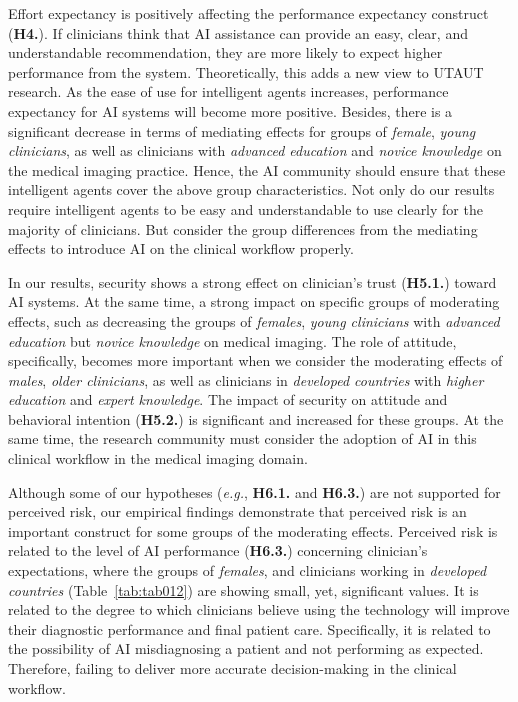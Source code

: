 Effort expectancy is positively affecting the performance expectancy construct ({\bf H4.}).
If clinicians think that AI assistance can provide an easy, clear, and understandable recommendation, they are more likely to expect higher performance from the system.
Theoretically, this adds a new view to UTAUT research.
As the ease of use for intelligent agents increases, performance expectancy for AI systems will become more positive.
Besides, there is a significant decrease in terms of mediating effects for groups of {\it female}, {\it young clinicians}, as well as clinicians with {\it advanced education} and {\it novice knowledge} on the medical imaging practice.
Hence, the AI community should ensure that these intelligent agents cover the above group characteristics.
Not only do our results require intelligent agents to be easy and understandable to use clearly for the majority of clinicians.
But consider the group differences from the mediating effects to introduce AI on the clinical workflow properly.

In our results, security shows a strong effect on clinician's trust ({\bf H5.1.}) toward AI systems. At the same time, a strong impact on specific groups of moderating effects, such as decreasing the groups of {\it females}, {\it young clinicians} with {\it advanced education} but {\it novice knowledge} on medical imaging.
The role of attitude, specifically, becomes more important when we consider the moderating effects of {\it males}, {\it older clinicians}, as well as clinicians in {\it developed countries} with {\it higher education} and {\it expert knowledge}.
The impact of security on attitude and behavioral intention ({\bf H5.2.}) is significant and increased for these groups. At the same time, the research community must consider the adoption of AI in this clinical workflow in the medical imaging domain.

Although some of our hypotheses ({\it e.g.}, {\bf H6.1.} and {\bf H6.3.}) are not supported for perceived risk, our empirical findings demonstrate that perceived risk is an important construct for some groups of the moderating effects.
Perceived risk is related to the level of AI performance ({\bf H6.3.}) concerning clinician's expectations, where the groups of {\it females}, and clinicians working in {\it developed countries} (Table~\ref{tab:tab012}) are showing small, yet, significant values.
It is related to the degree to which clinicians believe using the technology will improve their diagnostic performance and final patient care.
Specifically, it is related to the possibility of AI misdiagnosing a patient and not performing as expected.
Therefore, failing to deliver more accurate decision-making in the clinical workflow.

